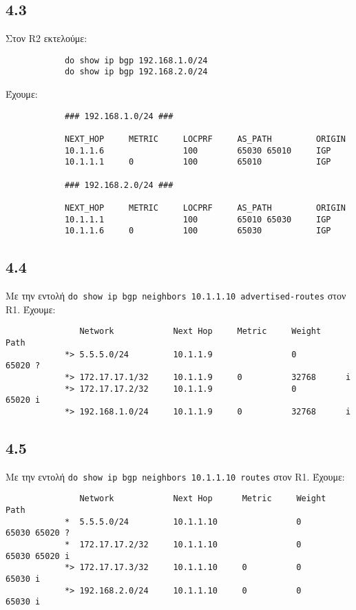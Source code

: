 \documentclass[a4paper, 12pt]{article}
\begin{document}
	\subsection*{4.3}
		Στον R2 εκτελούμε:
		
		\begin{verbatim}
			do show ip bgp 192.168.1.0/24
			do show ip bgp 192.168.2.0/24
		\end{verbatim}
		
		Έχουμε:
		
		\begin{verbatim}
			### 192.168.1.0/24 ###
			
			NEXT_HOP     METRIC     LOCPRF     AS_PATH         ORIGIN
			10.1.1.6                100        65030 65010     IGP
			10.1.1.1     0          100        65010           IGP
			
			### 192.168.2.0/24 ###
			
			NEXT_HOP     METRIC     LOCPRF     AS_PATH         ORIGIN
			10.1.1.1                100        65010 65030     IGP
			10.1.1.6     0          100        65030           IGP
		\end{verbatim}
		
	\subsection*{4.4}
		Με την εντολή \verb|do show ip bgp neighbors 10.1.1.10 advertised-routes| στον R1. Έχουμε:
		
		\begin{verbatim}
			   Network            Next Hop     Metric     Weight     Path
			*> 5.5.5.0/24         10.1.1.9                0          65020 ?
			*> 172.17.17.1/32     10.1.1.9     0          32768      i
			*> 172.17.17.2/32     10.1.1.9                0          65020 i
			*> 192.168.1.0/24     10.1.1.9     0          32768      i
		\end{verbatim}

	\subsection*{4.5}
		Με την εντολή \verb|do show ip bgp neighbors 10.1.1.10 routes| στον R1. Έχουμε:
		
		\begin{verbatim}
			   Network            Next Hop      Metric     Weight     Path
			*  5.5.5.0/24         10.1.1.10                0          65030 65020 ?
			*  172.17.17.2/32     10.1.1.10                0          65030 65020 i
			*> 172.17.17.3/32     10.1.1.10     0          0          65030 i
			*> 192.168.2.0/24     10.1.1.10     0          0          65030 i
		\end{verbatim}
\end{document}
